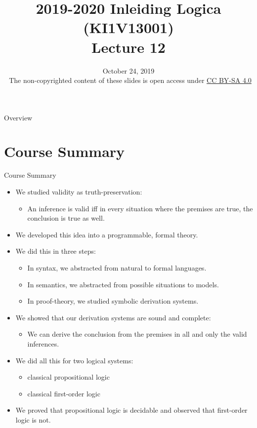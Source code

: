 \documentclass[../slides.tex]{subfiles}
\title{2019-2020 Inleiding Logica (KI1V13001) \\ Lecture 12}
\date{October 24, 2019\\[2ex] {\tiny \textcopyright~The non-copyrighted content of these slides is open access under \href{https://creativecommons.org/licenses/by-sa/4.0/}{CC BY-SA 4.0}}}
\begin{document}
\setcounter{framenumber}{372}
\begin{frame}
	\maketitle
\end{frame}

\begin{frame}{Overview}
\tableofcontents
\end{frame}

\section{Course Summary}
\begin{frame}{Course Summary}
	
  \begin{itemize}

    \item We studied validity as truth-preservation:
      \begin{itemize}
      \item An inference is valid iff in every situation where the
        premises are true, the conclusion is true as well.
      \end{itemize}
      \item We developed this idea into a programmable, formal theory.
      \item We did this in three steps:
        \begin{itemize}
        \item In syntax, we abstracted from natural to formal
          languages.
        \item In semantics, we abstracted from possible situations to models.
          
            \item In proof-theory, we studied symbolic derivation systems.
            \end{itemize}
              \item We showed that our derivation systems are sound
                and complete:
                \begin{itemize}
                \item We can derive the conclusion from the premises
                  in all and only the valid inferences.
                \end{itemize}
                \item We did all this for two logical systems:
            \begin{itemize}
            \item classical propositional logic
              \item classical first-order logic
              \end{itemize}
                \item We proved that propositional logic is decidable
                  and observed that first-order logic is not.
										
	\end{itemize}

\end{frame}
\end{document}
